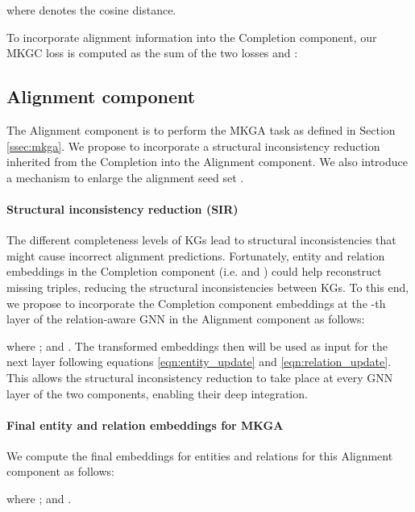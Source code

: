 \documentclass[11pt]{article}
\begin{document}
\noindent where  denotes the cosine distance. 

To incorporate alignment information into the Completion component, our MKGC loss is computed as the sum of the two losses  and  : 





\subsection{Alignment component}\label{ssec:alignment}

The Alignment component is to perform the MKGA task as defined in Section \ref{ssec:mkga}. 
We propose to incorporate a structural inconsistency reduction inherited from the Completion into the Alignment component. We also introduce a mechanism to enlarge the alignment seed set .



\paragraph{Structural inconsistency reduction (SIR)} The different completeness levels of KGs lead to structural inconsistencies that might cause incorrect alignment predictions. Fortunately, entity and relation embeddings  in the Completion component (i.e.  and ) could help reconstruct missing triples,  reducing the structural inconsistencies between KGs. To this end, we propose to  incorporate the Completion component embeddings at the -th layer of the relation-aware GNN in the Alignment component as follows: 





\noindent where ; and . The transformed embeddings then will be used as input for the next layer following equations \ref{eqn:entity_update} and \ref{eqn:relation_update}. 
This allows the structural inconsistency reduction to take place at every GNN layer of the two components, enabling their deep integration. 

\paragraph{Final  entity and relation embeddings for MKGA} We compute the final embeddings for entities and relations for this Alignment component as follows:




\noindent where ; and .
\end{document}

